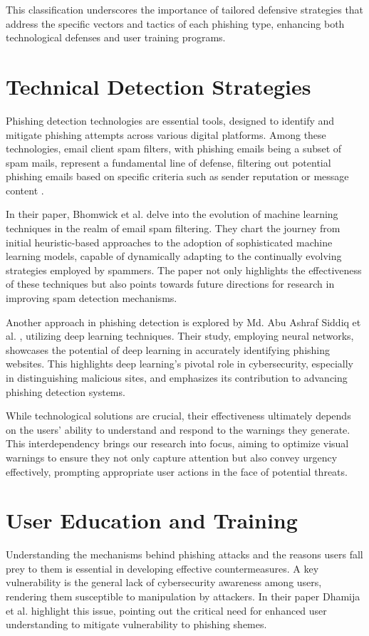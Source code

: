 \documentclass[
  a4paper,  %
  twoside,  %
  bibliography=totoc,
  headsepline,
  cleardoublepage=empty,
  parskip=half,
  draft=false
]{scrbook}
\begin{document}
This classification underscores the importance of tailored defensive strategies that address the specific vectors and tactics of each phishing type, enhancing both technological defenses and user training programs.

\section{Technical Detection Strategies}
Phishing detection technologies are essential tools, designed to identify and mitigate phishing attempts across various digital platforms. Among these technologies, email client spam filters, with phishing emails being a subset of spam mails, represent a fundamental line of defense, filtering out potential phishing emails based on specific criteria such as sender reputation \cite{shi} or message content \cite{alexy}.

In their paper, Bhomwick et al. \cite{alexy} delve into the evolution of machine learning techniques in the realm of email spam filtering. They chart the journey from initial heuristic-based approaches to the adoption of sophisticated machine learning models, capable of dynamically adapting to the continually evolving strategies employed by spammers. The paper not only highlights the effectiveness of these techniques but also points towards future directions for research in improving spam detection mechanisms.

Another approach in phishing detection is explored by Md. Abu Ashraf Siddiq et al. \cite{siddiq}, utilizing deep learning techniques. Their study, employing neural networks, showcases the potential of deep learning in accurately identifying phishing websites. This highlights deep learning's pivotal role in cybersecurity, especially in distinguishing malicious sites, and emphasizes its contribution to advancing phishing detection systems.

While technological solutions are crucial, their effectiveness ultimately depends on the users' ability to understand and respond to the warnings they generate. This interdependency brings our research into focus, aiming to optimize visual warnings to ensure they not only capture attention but also convey urgency effectively, prompting appropriate user actions in the face of potential threats.

\section{User Education and Training}
Understanding the mechanisms behind phishing attacks and the reasons users fall prey to them is essential in developing effective countermeasures. A key vulnerability is the general lack of cybersecurity awareness among users, rendering them susceptible to manipulation by attackers. In their paper Dhamija et al. \cite{dhamija} highlight this issue, pointing out the critical need for enhanced user understanding to mitigate vulnerability to phishing shemes. 
\end{document}
